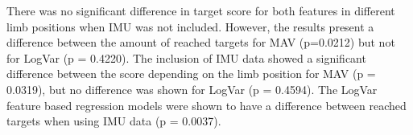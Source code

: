 	
	
	
	There was no significant difference in target score for both features in different limb positions when IMU was not included.  However, the results present a difference between the amount of reached targets for MAV (p=0.0212) but not for LogVar (p = 0.4220). The inclusion of IMU data showed a significant difference between the score depending on the limb position for MAV (p = 0.0319), but no difference was shown for LogVar (p = 0.4594). The LogVar feature based regression models were shown to have a difference between reached targets when using IMU data (p = 0.0037).
	 
